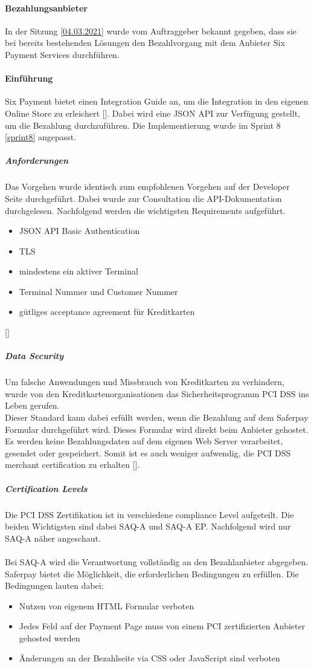 \paragraph{Bezahlungsanbieter}
In der Sitzung \ref{04.03.2021} wurde vom Auftraggeber bekannt gegeben, dass sie bei bereits bestehenden Lösungen den Bezahlvorgang mit dem Anbieter Six Payment Services durchführen. 

\paragraph{Einführung}
Six Payment bietet einen Integration Guide an, um die Integration in den eigenen Online Store zu erleichert [\cite{sixECommerce}]. Dabei wird eine JSON API zur Verfügung gestellt, um die Bezahlung durchzuführen. 
Die Implementierung wurde im Sprint 8 \ref{sprint8} angepasst. 
\subparagraph{Anforderungen}
Das Vorgehen wurde identisch zum empfohlenen Vorgehen auf der Developer Seite durchgeführt. Dabei wurde zur Consultation die \ac{API}-Dokumentation durchgelesen. Nachfolgend werden die wichtigsten Requirements aufgeführt. 
\begin{itemize}
	\item JSON API Basic Authentication
	\item TLS 
	\item mindestens ein aktiver Terminal
	\item Terminal Nummer und Customer Nummer
	\item gütliges acceptance agreement für Kreditkarten
\end{itemize} 
[\cite{jsonAPISix}]
\subparagraph{Data Security}
Um falsche Anwendungen und Missbrauch von Kreditkarten zu verhindern, wurde von den Kreditkartenorganisationen das Sicherheitsprogramm \ac{PCI DSS} ins Leben gerufen. \\
Dieser Standard kann dabei erfüllt werden, wenn die Bezahlung auf dem Saferpay Formular durchgeführt wird. Dieses Formular wird direkt beim Anbieter gehostet. Es werden keine Bezahlungsdaten auf dem eigenen Web Server verarbeitet, gesendet oder gespeichert. Somit ist es auch weniger aufwendig, die PCI DSS merchant certification zu erhalten [\cite{jsonAPISix}]. 

\subparagraph{Certification Levels}
Die \ac{PCI DSS} Zertifikation ist in verschiedene compliance Level aufgeteilt. Die beiden Wichtigsten sind dabei \ac{SAQ}-A und \ac{SAQ}-A EP. Nachfolgend wird nur \ac{SAQ}-A näher angeschaut. \\\\
Bei \ac{SAQ}-A wird die Verantwortung vollständig an den Bezahlanbieter abgegeben. Saferpay bietet die Möglichkeit, die erforderlichen Bedingungen zu erfüllen. Die Bedingungen lauten dabei: 
\begin{itemize}
	\item Nutzen von eigenem HTML Formular verboten
	\item Jedes Feld auf der Payment Page muss von einem PCI zertifizierten Anbieter gehosted werden
	\item Änderungen an der Bezahlseite via CSS oder JavaScript sind verboten
\end{itemize}

